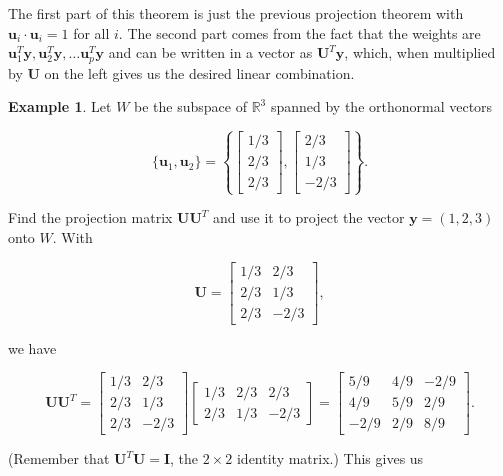 \documentclass[
]{book}
\theoremstyle{definition}
\theoremstyle{definition}
\newtheorem{example}{Example}[chapter]
\theoremstyle{definition}
\theoremstyle{definition}
\theoremstyle{remark}
\begin{document}
The first part of this theorem is just the previous projection theorem with \(\mathbf{u}_i\cdot\mathbf{u}_i=1\) for all \(i\). The second part comes from the fact that the weights are \(\mathbf{u}_1^T\mathbf{y},\mathbf{u}_2^T\mathbf{y},\dots \mathbf{u}_p^T\mathbf{y}\) and can be written in a vector as \(\mathbf{U}^T\mathbf{y}\), which, when multiplied by \(\mathbf{U}\) on the left gives us the desired linear combination.

\begin{examplebox}

\begin{example}
Let \(W\) be the subspace of \(\mathbb{R}^3\) spanned by the orthonormal vectors

\[\{\mathbf{u}_1,\mathbf{u}_2\}=\left\{\begin{bmatrix}1/3\\2/3\\2/3\end{bmatrix},\begin{bmatrix} 2/3\\ 1/3\\-2/3\end{bmatrix}\right\}.\]

Find the projection matrix \(\mathbf{U}\mathbf{U}^T\) and use it to project the vector \(\mathbf{y}=(1,2,3)\) onto \(W\). With

\[\mathbf{U}=\begin{bmatrix} 1/3 & 2/3 \\ 2/3 & 1/3\\ 2/3 & -2/3\end{bmatrix},\]

we have

\[\mathbf{U}\mathbf{U}^T=\begin{bmatrix} 1/3 & 2/3 \\ 2/3 & 1/3\\ 2/3 & -2/3\end{bmatrix}\begin{bmatrix} 1/3 & 2/3 & 2/3\\2/3 & 1/3 & -2/3\end{bmatrix} =\begin{bmatrix} 5/9 & 4/9 & -2/9\\ 4/9 & 5/9 & 2/9\\ -2/9 & 2/9 & 8/9\end{bmatrix}.\]

(Remember that \(\mathbf{U}^T\mathbf{U}=\mathbf{I}\), the \(2\times 2\) identity matrix.) This gives us


\end{example}
\end{examplebox}
\end{document}
